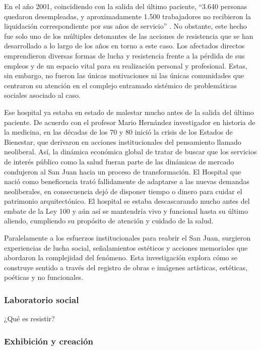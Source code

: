 En el año 2001, coincidiendo con la salida del último paciente, “3.640 personas quedaron desempleadas, y aproximadamente 1.500 trabajadores no recibieron la liquidación correspondiente por sus años de servicio” \parencite{Castiblanco2017}. No obstante, este hecho fue solo uno de los múltiples detonantes de las acciones de resistencia que se han desarrollado a lo largo de los años en torno a este caso. Los afectados directos emprendieron diversas formas de lucha y resistencia frente a la pérdida de sus empleos y de un espacio vital para su realización personal y profesional. Estas, sin embargo, no fueron las únicas motivaciones ni las únicas comunidades que centraron su atención en el complejo entramado sistémico de problemáticas sociales asociado al caso.

Ese hospital ya estaba en estado de malestar mucho antes de la salida del último paciente. De acuerdo con el profesor Mario Hernández investigador en historia de la medicina, en las décadas de los 70 y 80 inició la crisis de los Estados de Bienestar, que derivaron en acciones institucionales del pensamiento llamado neoliberal. Así, la dinámica económica global de tratar de buscar que los servicios de interés público como la salud fueran parte de las dinámicas de mercado condujeron al San Juan hacia un proceso de transformación. El Hospital que nació como beneficencia trató fallidamente de adaptarse a las nuevas demandas neoliberales, en consecuencia dejó de disponer tiempo o dinero para cuidar el patrimonio arquitectónico. El hospital se estaba descascarando mucho antes del embate de la Ley 100 y aún así se mantendría vivo y funcional hasta su último aliendo, cumpliendo su propósito de atención y cuidado de la salud.

Paralelamente a los esfuerzos institucionales para reabrir el San Juan, surgieron experiencias de lucha social, señalamientos estéticos y acciones memoriales que abordaron la complejidad del fenómeno. Esta investigación explora cómo se construye sentido a través del registro de obras e imágenes artísticas, estéticas, poéticas y no funcionales.

\subsubsection*{Laboratorio social}

¿Qué es resistir?

\subsubsection*{Exhibición y creación}

